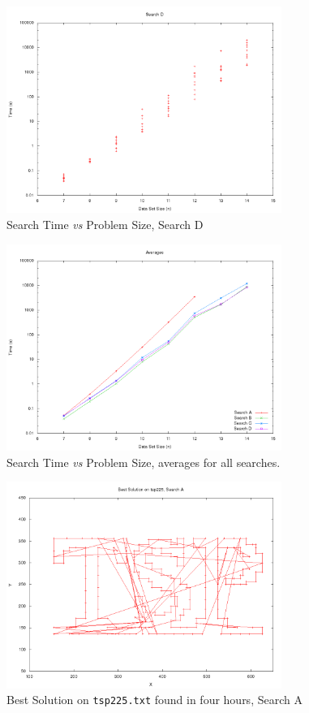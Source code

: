 \documentclass{article}
\begin{document}
\begin{figure}[p]
	\centering
	\includegraphics[width=0.8\textwidth]{../images/times_search_d.png}
	\caption{Search Time {\it vs} Problem Size, Search D}
	\label{fig:times_search_d}
\end{figure}

\begin{figure}[p]
	\centering
	\includegraphics[width=0.8\textwidth]{../images/times_avgs.png}
	\caption{Search Time {\it vs} Problem Size, averages for all searches.}
	\label{fig:times_search_a}
\end{figure}

\begin{figure}[p]
	\centering
	\includegraphics[width=0.8\textwidth]{../images/paths_search_a.png}
	\caption{Best Solution on {\tt tsp225.txt} found in four hours, Search A}
	\label{fig:paths_search_a}
\end{figure}
\end{document}
